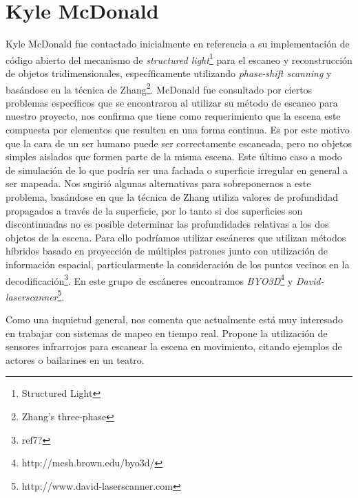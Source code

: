 \section{Kyle McDonald}%
Kyle McDonald\cite{KyleMcDonald} fue contactado inicialmente en referencia a su implementación de código abierto del mecanismo de \emph{structured light}\footnote{Structured Light} para el escaneo y reconstrucción de objetos tridimensionales, específicamente utilizando \emph{phase-shift scanning} y basándose en la técnica de Zhang\footnote{Zhang's three-phase}. McDonald fue consultado por ciertos problemas específicos %
que se encontraron al utilizar su método de escaneo para nuestro proyecto, nos confirma que tiene como requerimiento que la escena este compuesta por elementos que resulten en una forma continua. Es por este motivo que la cara de un ser humano puede ser correctamente escaneada, pero no objetos simples aislados que formen parte de la misma escena. Este último caso a modo de simulación de lo que podría ser una fachada o superficie irregular en general a ser mapeada. Nos sugirió algunas alternativas para sobreponernos a este problema, basándose en que la técnica de Zhang utiliza valores de profundidad propagados a través de la superficie, por lo tanto si dos superficies son discontinuadas no es posible determinar las profundidades relativas a los dos objetos de la escena. Para ello podríamos utilizar escáneres que utilizan métodos híbridos basado en proyección de múltiples patrones junto con utilización de información espacial, particularmente la consideración de los puntos vecinos en la decodificación\footnote{ref7?}. En este grupo de escáneres encontramos \emph{BYO3D}\footnote{http://mesh.brown.edu/byo3d/} y \emph{David-laserscanner}\footnote{http://www.david-laserscanner.com}.

Como una inquietud general, nos comenta que actualmente está muy interesado en trabajar con sistemas de mapeo en tiempo real. Propone la utilización de sensores infrarrojos para escanear la escena en movimiento, citando ejemplos de actores o bailarines en un teatro.